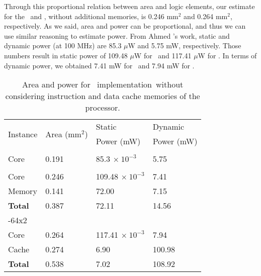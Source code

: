 Through this proportional relation between area and logic elements, our estimate for the \timestamp~and \cshiamt, without additional memories, is 0.246 mm$^{2}$ and 0.264 mm$^{2}$, respectively. As we said, area and power can be proportional, and thus we can use similar reasoning to estimate power. From Ahmed \etal's work, static and dynamic power (at 100 MHz) are 85.3 $\mu$W and 5.75 mW, respectively. Those numbers result in static power of 109.48 $\mu$W for \timestamp~and 117.41 $\mu$W for \cshiamt. In terms of dynamic power, we obtained 7.41 mW for \timestamp~and 7.94 mW for \cshiamt.
\begin{table}[!ht]
	\center
	\caption{Area and power for \cshia~implementation~without considering instruction and data cache memories of the processor.}
	\label{tab:area-power}
	\footnotesize
	\begin{tabular}{|l|l|p{0.65in}|p{0.6in}|}
		\hline
			\multirow{2}{*}{Instance} & \multirow{2}{*}{Area (mm$^{2}$)} & Static & Dynamic\\ 
			 & & Power (mW) & Power (mW)\\ 
		\hline
		\hline
			\baseline & & & \\
				\hspace{0.25in} Core & 0.191 & 85.3 $\times~10^{-3}$ & 5.75 \\
			\timestamp & & & \\
				\hspace{0.25in} Core & 0.246 & 109.48 $\times~10^{-3}$ & 7.41 \\
				\hspace{0.25in} Memory & 0.141 & 72.00 & 7.15  \\
				\hspace{0.25in} \textbf{Total} & 0.387 & 72.11 & 14.56  \\
			\cshiamt-64x2 & & & \\
				\hspace{0.25in} Core & 0.264 & 117.41 $\times~10^{-3}$ & 7.94 \\
				\hspace{0.25in} Cache & 0.274 & 6.90 & 100.98  \\
				\hspace{0.25in} \textbf{Total} & 0.538 & 7.02 & 108.92 \\
		\hline
	\end{tabular}
\end{table}

